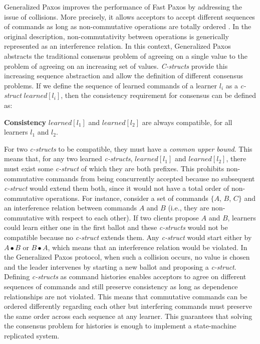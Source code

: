 Generalized Paxos improves the performance of Fast Paxos by addressing the issue of collisions. More precisely, it allows acceptors to accept different sequences of commands as long as non-commutative operations are totally ordered \cite{Lamport2005}.  In the original description, non-commutativity between operations is generically represented as an interference relation. In this context, Generalized Paxos abstracts the traditional consensus problem of agreeing on a single value to the problem of agreeing on an increasing set of values. \textit{C-structs} provide this increasing sequence abstraction and allow the definition of different consensus problems. If we define the sequence of learned commands of a learner $l_i$ as a \textit{c-struct} $learned[l_i]$, then the consistency requirement for consensus can be defined as:\par
\textbf{Consistency} $learned[l_1]$ and $learned[l_2]$ are always compatible, for all learners $l_1$ and $l_2$. \par
For two \textit{c-structs} to be compatible, they must have a \textit{common upper bound}. This means that, for any two learned \textit{c-structs}, $learned[l_1]$ and $learned[l_2]$, there must exist some \textit{c-struct} of which they are both prefixes. This prohibits non-commutative commands from being concurrently accepted because no subsequent \textit{c-struct} would extend them both, since it would not have a total order of non-commutative operations. For instance, consider a set of commands $\lbrace A$, $B$, $C\rbrace$ and an interference relation between commands $A$ and $B$ (i.e., they are non-commutative with respect to each other). If two clients propose $A$ and $B$, learners could learn either one in the first ballot and these \textit{c-structs} would not be compatible because no \textit{c-struct} extends them. Any \textit{c-struct} would start either by $A \bullet B$ or $B \bullet A$, which means that an interference relation would be violated. In the Generalized Paxos protocol, when such a collision occurs, no value is chosen and the leader intervenes by starting a new ballot and proposing a \textit{c-struct}. Defining \textit{c-structs} as command histories enables acceptors to agree on different sequences of commands and still preserve consistency as long as dependence relationships are not violated. This means that commutative commands can be ordered differently regarding each other but interfering commands must preserve the same order across each sequence at any learner. This guarantees that solving the consensus problem for histories is enough to implement a state-machine replicated system. \par


